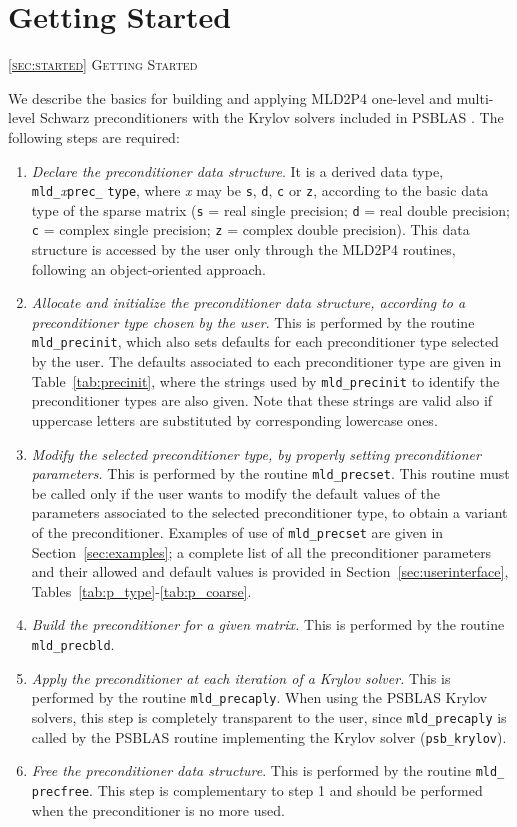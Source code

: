 \section{Getting Started\label{sec:started}}
         {\textsc{\ref{sec:started} Getting Started}}

We describe the basics for building and applying MLD2P4 one-level and multi-level
Schwarz preconditioners with the Krylov solvers included in PSBLAS \cite{PSBLASGUIDE}.
The following steps are required:
\begin{enumerate} 
\item \emph{Declare the preconditioner data structure}. It is a derived data type,
  \verb|mld_|\-\emph{x}\verb|prec_| \verb|type|, where \emph{x} may be \verb|s|, \verb|d|, \verb|c|
	or \verb|z|, according to the basic data type of the sparse matrix
	(\verb|s| = real single precision; \verb|d| = real double precision;
	\verb|c| = complex single precision; \verb|z| = complex double precision).
	This data structure is accessed by the user only through the MLD2P4 routines,
	following an object-oriented approach.
\item \emph{Allocate and initialize the preconditioner data structure, according to
	a preconditioner type chosen by the user}. This is performed by the routine
	\verb|mld_precinit|, which also sets defaults for each preconditioner
	type selected by the user. The defaults associated to each preconditioner
	type are given in Table~\ref{tab:precinit}, where the strings used by
	\verb|mld_precinit| to identify the preconditioner types are also given.
	Note that these strings are valid also if uppercase letters are substituted by
	corresponding lowercase ones.
\item \emph{Modify the selected preconditioner type, by properly setting
  preconditioner parameters.} This is performed by the routine \verb|mld_precset|.
  This routine must be called only if the user wants to modify the default values
  of the parameters associated to the selected preconditioner type, to obtain a variant
  of the preconditioner. Examples of use of \verb|mld_precset| are given in
  Section~\ref{sec:examples}; a complete list of all the
  preconditioner parameters and their allowed and default values is provided in 
  Section~\ref{sec:userinterface}, Tables~\ref{tab:p_type}-\ref{tab:p_coarse}. 
\item \emph{Build the preconditioner for a given matrix.} This is performed by
  the routine \verb|mld_precbld|.
\item \emph{Apply the preconditioner at each iteration of a Krylov solver.}
  This is performed by the routine \verb|mld_precaply|. When using the PSBLAS Krylov solvers,
  this step is completely transparent to the user, since \verb|mld_precaply| is called
  by the PSBLAS routine implementing the Krylov solver (\verb|psb_krylov|).
\item \emph{Free the preconditioner data structure}. This is performed by
  the routine \verb|mld_| \verb|precfree|. This step is complementary to step 1 and should
  be performed when the preconditioner is no more used.
\end{enumerate}
